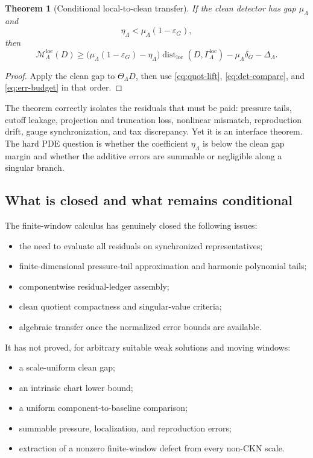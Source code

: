 \documentclass[11pt]{article}
\numberwithin{equation}{section}
\newtheorem{theorem}{Theorem}[section]
\theoremstyle{remark}
\DeclareMathOperator{\dist}{dist}
\newcommand{\eps}{\varepsilon}
\newcommand{\loc}{\mathrm{loc}}
\newcommand{\calM}{\mathcal M}
\begin{document}
\begin{theorem}[Conditional local-to-clean transfer]\label{thm:local-clean}
If the clean detector has gap $\mu_\Lambda$ and
\[
\eta_\Lambda<\mu_\Lambda(1-\eps_G),
\]
then
\begin{equation}\label{eq:local-clean}
\calM_\Lambda^{\loc}(D)
\ge
\bigl(\mu_\Lambda(1-\eps_G)-\eta_\Lambda\bigr)
\dist_{\loc}(D,\Gamma_\Lambda^{\loc})
-
\mu_\Lambda\delta_G-\Delta_\Lambda.
\end{equation}
\end{theorem}

\begin{proof}
Apply the clean gap to $\Theta_\Lambda D$, then use \eqref{eq:quot-lift}, \eqref{eq:det-compare}, and \eqref{eq:err-budget} in that order.
\end{proof}

The theorem correctly isolates the residuals that must be paid: pressure tails, cutoff leakage, projection and truncation loss, nonlinear mismatch, reproduction drift, gauge synchronization, and tax discrepancy. Yet it is an interface theorem. The hard PDE question is whether the coefficient $\eta_\Lambda$ is below the clean gap margin and whether the additive errors are summable or negligible along a singular branch.

\subsection{What is closed and what remains conditional}

The finite-window calculus has genuinely closed the following issues:
\begin{itemize}
\item the need to evaluate all residuals on synchronized representatives;
\item finite-dimensional pressure-tail approximation and harmonic polynomial tails;
\item componentwise residual-ledger assembly;
\item clean quotient compactness and singular-value criteria;
\item algebraic transfer once the normalized error bounds are available.
\end{itemize}
It has not proved, for arbitrary suitable weak solutions and moving windows:
\begin{itemize}
\item a scale-uniform clean gap;
\item an intrinsic chart lower bound;
\item a uniform component-to-baseline comparison;
\item summable pressure, localization, and reproduction errors;
\item extraction of a nonzero finite-window defect from every non-CKN scale.
\end{itemize}
\end{document}

